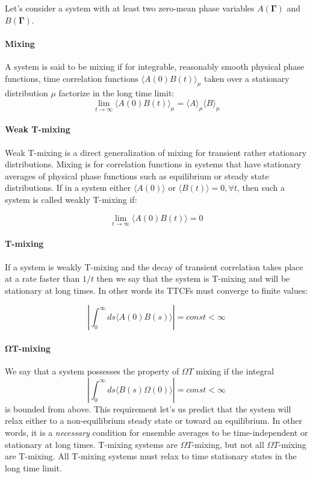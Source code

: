 \documentclass[a4paper,12pt]{article}
\begin{document}
Let's consider a system with at least two zero-mean phase variables $A(\bm{\Gamma})$ and $B(\bm{\Gamma})$. 

\paragraph{Mixing}

A system is said to be mixing if for integrable, reasonably smooth physical phase functions, time correlation functions $\langle A(0) B(t) \rangle_{\mu}$ taken over a stationary distribution $\mu$ factorize in the long time limit:
\begin{equation}
  \lim_{t \to \infty} \langle A(0) B(t)\rangle_{\mu} = \langle A \rangle_{\mu} \langle B \rangle_{\mu}  
\end{equation}

\paragraph{Weak T-mixing}

Weak T-mixing is a direct generalization of mixing for transient rather stationary distributions. Mixing is for correlation functions in systems that have stationary averages of physical phase functions such as equilibrium or steady state distributions.
If in a system either $\langle A(0) \rangle $ or $ \langle B(t) \rangle = 0, \forall t $, then such a system is called weakly T-mixing if:

\begin{equation}
  \lim_{t \to \infty} \langle A(0) B(t) \rangle = 0
\end{equation}

\paragraph{T-mixing}
If a system is weakly T-mixing and the decay of transient correlation takes place at a rate faster than $1/t$ then we say that the system is T-mixing and will be stationary at long times. In other words its TTCFs must converge to finite values:

\begin{equation}
  \left| \int_0^{\infty} ds \langle A(0) B(s) \rangle \right| = const < \infty 
\end{equation}


\paragraph{$\bm{\Omega T}$-mixing}
We say that a system possesses the property of $\Omega T$ mixing if the integral
\begin{equation}
    \left| \int_0^{\infty} ds \langle B(s) \Omega(0) \rangle \right| = const < \infty
\end{equation}
is bounded from above. This requirement let's us predict that the system will relax either to a non-equilibrium steady state or toward an equilibrium. In other words, it is a \textit{necessary} condition for ensemble averages to be time-independent or stationary at long times.
T-mixing systems are $\Omega T$-mixing, but not all $\Omega T$-mixing are T-mixing. All T-mixing systems must relax to time stationary states in the long time limit.
\end{document}
